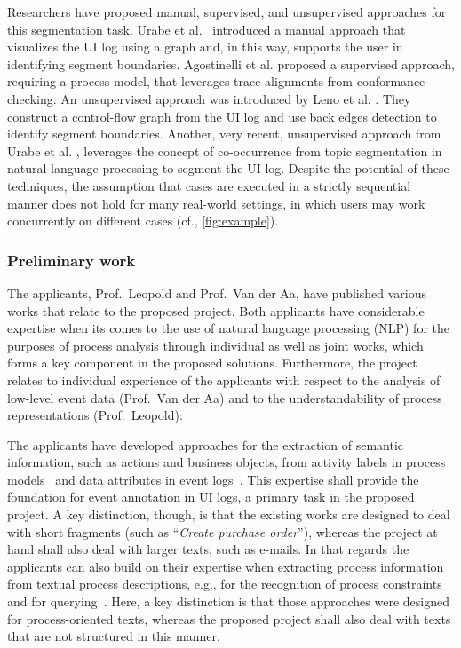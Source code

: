 Researchers have proposed manual, supervised, and unsupervised approaches for this segmentation task. Urabe et al.~\cite{urabe2019visualizing} introduced a manual approach that visualizes the UI log using a graph and, in this way, supports the user in identifying segment boundaries. Agostinelli et al. \cite{agostinelli202111} proposed a supervised approach, requiring a process model, that leverages trace alignments from conformance checking. 
An unsupervised approach was introduced by Leno et al. \cite{leno2020identifying}. They construct a control-flow graph from the UI log and use back edges detection to identify segment boundaries. Another, very recent, unsupervised approach from Urabe et al. \cite{Urabe21}, leverages the concept of co-occurrence from topic segmentation in natural language processing to segment the UI log. Despite the potential of these techniques, 
the assumption that cases are executed in a strictly sequential manner does not hold for many real-world settings, in which users may work concurrently on different cases (cf., \autoref{fig:example}).



\subsubsection{Preliminary work}
\label{sec:preliminarywork}

The applicants, Prof.\ Leopold and Prof.\ Van der Aa, have published various works that relate to the proposed project. Both applicants have considerable expertise when its comes to the use of natural language processing (NLP) for the purposes of process analysis through individual as well as joint works, which forms a key component in the proposed solutions.
Furthermore, the project relates to individual experience of the applicants with respect to the analysis of low-level event data (Prof.\ Van der Aa) and to the understandability of process representations (Prof.\ Leopold):


The applicants have developed approaches for the extraction of semantic information, such as actions and business objects, from activity labels in process models~\cite{leopold2013detection,leopold2019using} and data attributes in event logs~\cite{rebmann2021extracting}.
This expertise shall provide the foundation for event annotation in UI logs, a primary task in the proposed project. A key distinction, though, is that the existing works are designed to deal with short fragments (such as ``\emph{Create purchase order}''), whereas the project at hand shall also deal with larger texts, such as e-mails. In that regards the applicants can also build on their expertise when extracting process information from textual process descriptions, e.g., for the recognition of process constraints~\cite{van2019extracting,winter2020assessing} and for querying~\cite{leopold2019searching}. Here, a key distinction is that those approaches were designed for process-oriented texts, whereas the proposed project shall also deal with texts that are not structured in this manner.

